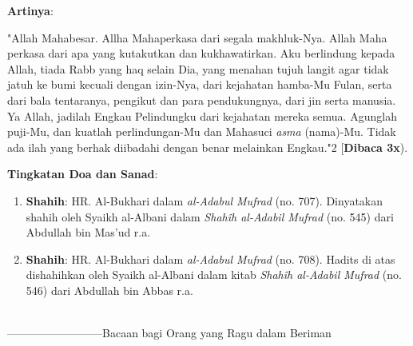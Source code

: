 \documentclass[a4paper,12pt]{article}
\begin{document}
\noindent
\textbf{Artinya}:
\par
\indent
"Allah Mahabesar. Allha Mahaperkasa dari segala makhluk-Nya. Allah Maha 
perkasa dari apa yang kutakutkan dan kukhawatirkan. Aku berlindung kepada 
Allah, tiada Rabb yang haq selain Dia, yang menahan tujuh langit agar tidak
jatuh ke bumi kecuali dengan izin-Nya, dari kejahatan hamba-Mu Fulan, serta
dari bala tentaranya, pengikut dan para pendukungnya, dari jin serta 
manusia. Ya Allah, jadilah Engkau Pelindungku dari kejahatan mereka semua. 
Agunglah puji-Mu, dan kuatlah perlindungan-Mu dan Mahasuci \textit{asma} 
(nama)-Mu. Tidak ada ilah yang berhak diibadahi dengan benar melainkan 
Engkau."{\scriptsize 2} [\textbf{Dibaca 3x}).\\
\par
\noindent
\textbf{Tingkatan Doa dan Sanad}:
\begin{enumerate}
\item \textbf{Shahih}: HR. Al-Bukhari dalam \textit{al-Adabul Mufrad} (no. 
707). Dinyatakan shahih oleh Syaikh al-Albani dalam \textit{Shah\^{i}h 
al-Adabil Mufrad} (no. 545) dari Abdullah bin Mas'ud r.a.
\item \textbf{Shahih}: HR. Al-Bukhari dalam \textit{al-Adabul Mufrad} (no. 
708). Hadits di atas dishahihkan oleh Syaikh al-Albani dalam kitab 
\textit{Shah\^{i}h al-Adabil Mufrad} (no. 546) dari Abdullah bin Abbas r.a.\\\\
\end{enumerate}
\par
{}--------------------------Bacaan bagi Orang yang Ragu dalam Beriman
\noindent
\end{document}
